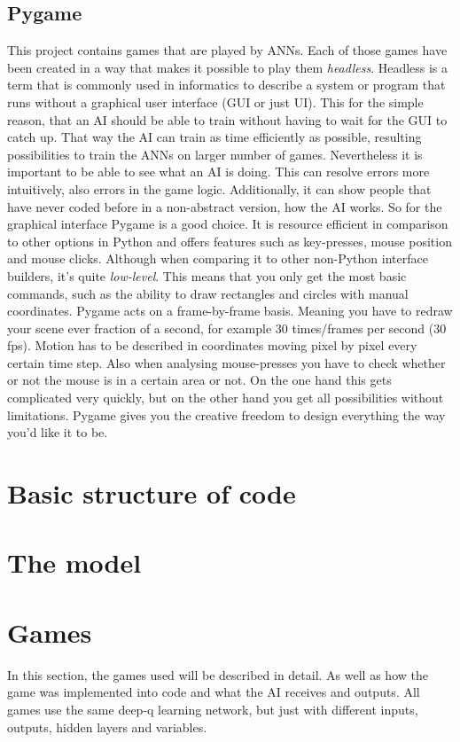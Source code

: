 \documentclass[12pt]{article}
\begin{document}
\subsection{Pygame}
This project contains games that are played by ANNs. Each of those games have been created in a way that makes it possible to play them \textit{headless}. Headless is a term that is commonly used in informatics to describe a system or program that runs without a graphical user interface (GUI or just UI). This for the simple reason, that an AI should be able to train without having to wait for the GUI to catch up. That way the AI can train as time efficiently as possible, resulting possibilities to train the ANNs on larger number of games. Nevertheless it is important to be able to see what an AI is doing. This can resolve errors more intuitively, also errors in the game logic. Additionally, it can show people that have never coded before in a non-abstract version, how the AI works. So for the graphical interface Pygame is a good choice. It is resource efficient in comparison to other options in Python and offers features such as key-presses, mouse position and mouse clicks. Although when comparing it to other non-Python interface builders, it's quite \textit{low-level}. This means that you only get the most basic commands, such as the ability to draw rectangles and circles with manual coordinates. Pygame acts on a frame-by-frame basis. Meaning you have to redraw your scene ever fraction of a second, for example 30 times/frames per second (30 fps). Motion has to be described in coordinates moving pixel by pixel every certain time step. Also when analysing mouse-presses you have to check whether or not the mouse is in a certain area or not. On the one hand this gets complicated very quickly, but on the other hand you get all possibilities without limitations. Pygame gives you the creative freedom to design everything the way you'd like it to be. \cite{PyGame}
\section{Basic structure of code}
\section{The model}
\section{Games}
In this section, the games used will be described in detail. As well as how the game was implemented into code and what the AI receives and outputs. All games use the same deep-q learning network, but just with different inputs, outputs, hidden layers and variables.
\end{document}
